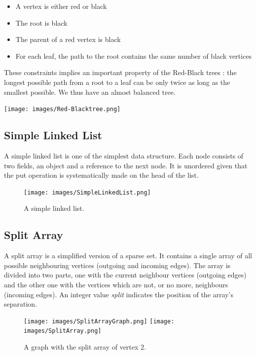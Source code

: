 \begin{itemize}
\item A vertex is either red or black
\item The root is black
\item The parent of a red vertex is black
\item For each leaf, the path to the root contains the same number of black vertices
\end{itemize}

These constraints implies an important property of the Red-Black trees : the longest possible path from a root to a leaf can be only twice as long as the smallest possible. We thus have an almost balanced tree.

\begin{center}
\texttt{[image: images/Red-Blacktree.png]}
\end{center}

\subsection{Simple Linked List}
A simple linked list is one of the simplest data structure. Each node consists of two fields, an object and a reference to the next node. It is unordered given that the put operation is systematically made on the head of the list.

\begin{figure}[!h]
\texttt{[image: images/SimpleLinkedList.png]}
\caption{A simple linked list.}
\end{figure}

\subsection{Split Array}
A split array is a simplified version of a sparse set. It contains a single array of all possible neighbouring vertices (outgoing and incoming edges). The array is divided into two parts, one with the current neighbour vertices (outgoing edges) and the other one with the vertices which are not, or no more, neighbours (incoming edges). An integer value \textit{split} indicates the position of the array's separation.

\begin{figure}[!h]
\texttt{[image: images/SplitArrayGraph.png]}\hfill
\texttt{[image: images/SplitArray.png]} %
\caption{A graph with the split array of vertex 2.}
\end{figure}

